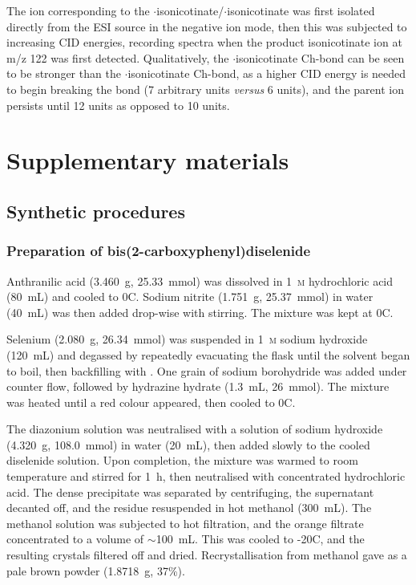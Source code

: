 \begin{refsection}
The ion corresponding to the $\cdot$isonicotinate/$\cdot$isonicotinate was first isolated directly from the ESI source in the negative ion mode, then this was subjected to increasing CID energies, recording spectra when the product isonicotinate ion at m/z 122 was first detected.
Qualitatively, the $\cdot$isonicotinate Ch-bond can be seen to be stronger than the $\cdot$isonicotinate Ch-bond, as a higher CID energy is needed to begin breaking the bond (7 arbitrary units \emph{versus} 6 units), and the parent ion persists until 12 units as opposed to 10 units.

\section{Supplementary materials}

\subsection{Synthetic procedures}

\subsubsection[Preparation of \refcmpd{diselenide}]{Preparation of bis(2-carboxyphenyl)diselenide }
\label{sec:diselenide_prep}
Anthranilic acid (3.460~g, 25.33~mmol) was dissolved in 1~\textsc{m} hydrochloric acid (80~mL) and cooled to 0\degree C.
Sodium nitrite (1.751~g, 25.37~mmol) in water (40~mL) was then added drop-wise with stirring.
The mixture was kept at 0\degree C.

Selenium (2.080~g, 26.34~mmol) was suspended in 1~\textsc{m} sodium hydroxide (120~mL) and degassed by repeatedly evacuating the flask until the solvent began to boil, then backfilling with .
One grain of sodium borohydride was added under  counter flow, followed by hydrazine hydrate (1.3~mL, 26~mmol).
The mixture was heated until a red colour appeared, then cooled to 0\degree C.

The diazonium solution was neutralised with a solution of sodium hydroxide (4.320~g, 108.0~mmol) in water (20~mL), then added slowly to the cooled diselenide solution.
Upon completion, the mixture was warmed to room temperature and stirred for 1~h, then neutralised with concentrated hydrochloric acid.
The dense precipitate was separated by centrifuging, the supernatant decanted off, and the residue resuspended in hot methanol (300~mL).
The methanol solution was subjected to hot filtration, and the orange filtrate concentrated to a volume of $\sim$100~mL.
This was cooled to -20\degree C, and the resulting crystals filtered off and dried.
Recrystallisation from methanol gave  as a pale brown powder (1.8718~g, 37\%).


\end{refsection}
